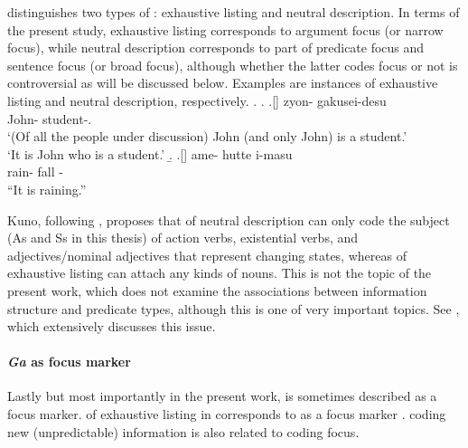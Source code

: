  distinguishes two types of :
exhaustive listing and neutral description.
In terms of the present study,
exhaustive listing corresponds to argument focus (or narrow focus),
while neutral description corresponds to part of predicate focus and sentence focus (or broad focus),
although whether the latter  codes focus or not is controversial
as will be discussed below.
Examples \Next[a-b] are instances of exhaustive listing and
neutral description, respectively.
%
\ex.
 \a. 
 \bg.[] zyon- gakusei-desu \\
      John- student-. \\
      `(Of all the people under discussion) John (and only John) is a student.' \\
      `It is John who is a student.'
 \b. 
 \bg.[] ame- hutte i-masu \\
      rain- fall - \\
      ``It is raining.''
      \hfill{\cite[p.~38]{kuno73}}

Kuno, following ,
proposes that
 of neutral description can only code
the subject (As and Ss in this thesis) of action verbs,
existential verbs, and
adjectives/nominal adjectives
that represent changing states,
whereas  of exhaustive listing can attach any kinds of nouns.
This is not the topic of the present work,
which does not examine
the associations between information structure and predicate types,
although this is one of very important topics.
See ,
which extensively discusses this issue.


\paragraph{\textit{Ga} as focus marker}
Lastly but most importantly in the present work,
 is sometimes described as a focus marker.
 of exhaustive listing in  corresponds to
 as a focus marker \cite{heycock08}.
 coding new (unpredictable) information \cite[Chapter 25]{kuno73j} is also related to  coding focus.

